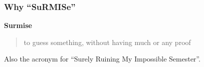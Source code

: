 \appendix

\begin{frame}
	\frametitle{Why ``SuRMISe''}
	\textbf{Surmise}
	\begin{quote}
		to guess something, without having much or any proof
	\end{quote}
	\par
	\vspace{1cm}
	Also the acronym for ``\alert{Su}rely \alert{R}uining \alert{M}y \alert{I}mpossible \alert{Se}mester''.
\end{frame}